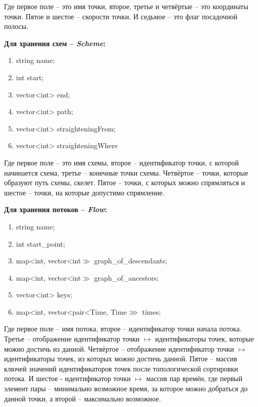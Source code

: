 \documentclass[12pt, a4 paper]{article}
\theoremstyle{plain}
\begin{document}
Где первое поле – это имя точки, второе, третье и четвёртые – это координаты точки. Пятое и шестое – скорости точки. И седьмое – это флаг посадочной полосы.


\textbf{Для хранения схем – \textit{Scheme}:}

\begin{enumerate}
	\item string name;
	\item int start;
	\item vector<int> end;
	\item vector<int> path;
	\item vector<int> straighteningFrom;
	\item vector<int> straighteningWhere
\end{enumerate}

Где первое поле – это имя схемы, второе – идентификатор точки, с которой начинается схема, третье – конечные точки схемы. Четвёртое – точки, которые образуют путь схемы, скелет. Пятое – точки, с которых можно спрямляться и шестое – точки, на которые допустимо спрямление.


\textbf{Для хранения потоков – \textit{Flow}:}

\begin{enumerate}
	\item string name;
	\item int start\_point;
	\item map<int, vector<int$\gg$ graph\_of\_descendants;
	\item map<int, vector<int$\gg$ graph\_of\_ancestors;
	\item vector<int> keys;
	\item map<int, vector<pair<Time, Time$\ggg$ times;
\end{enumerate}

Где первое поле – имя потока, второе – идентификатор точки начала потока. Третье – отображение идентификатор точки $\mapsto$ идентификаторы точек, которые можно достичь из данной. Четвёртое – отображение идентификатор точки $\mapsto$ идентификаторы точек, из которых можно достичь данной. Пятое – массив ключей значений идентификаторов точек после топологической сортировки потока. И шестое - идентификатор точки $\mapsto$ массив пар времён, где первый элемент пары – минимально возможное время, за которое можно добраться до данной точки, а второй – максимально возможное.
\end{document}
